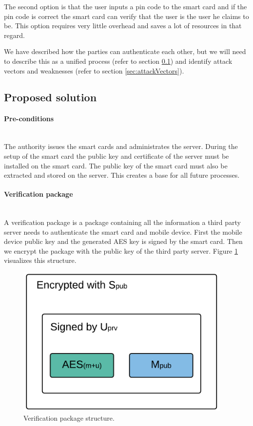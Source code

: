 The second option is that the user inputs a pin code to the smart card and if the pin code is correct the smart card can verify that the user is the user he claims to be. This option requires very little overhead and saves a lot of resources in that regard.

We have described how the parties can authenticate each other, but we will need to describe this as a unified process (refer to section \ref{sec:proposedSolution}) and identify attack vectors and weaknesses (refer to section \ref{sec:attackVectors}).

\subsection{Proposed solution}
\label{sec:proposedSolution}

\paragraph{Pre-conditions}\mbox{}\\
The authority issues the smart cards and administrates the server. During the setup of the smart card the public key and certificate of the server must be installed on the smart card. The public key of the smart card must also be extracted and stored on the server. This creates a base for all future processes.

\paragraph{Verification package}\mbox{}\\
A verification package is a package containing all the information a third party server needs to authenticate the smart card and mobile device. First the mobile device public key and the generated AES key is signed by the smart card. Then we encrypt the package with the public key of the third party server. Figure \ref{fig:h0} visualizes this structure.

\newpage

\begin{figure}[h!]
  \caption{Verification package structure.}
  \label{fig:h0}
  \centering
    \includegraphics[width=0.95\textwidth]{images/H0.png}
\end{figure}

